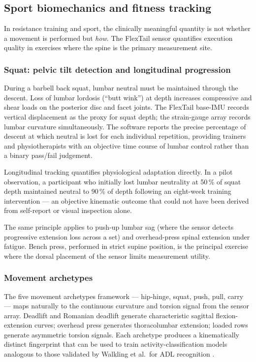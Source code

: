 \subsection{Sport biomechanics and fitness tracking}

In resistance training and sport, the clinically meaningful quantity is not whether
a movement is performed but \emph{how}.
The FlexTail sensor quantifies execution quality in exercises where the spine is the
primary measurement site.

\subsubsection{Squat: pelvic tilt detection and longitudinal progression}

During a barbell back squat, lumbar neutral must be maintained through the descent.
Loss of lumbar lordosis (``butt wink'') at depth increases compressive and shear loads
on the posterior disc and facet joints.
The FlexTail base-IMU records vertical displacement as the proxy for squat depth;
the strain-gauge array records lumbar curvature simultaneously.
The software reports the precise percentage of descent at which neutral is lost for
each individual repetition, providing trainers and physiotherapists with an objective
time course of lumbar control rather than a binary pass/fail judgement.

Longitudinal tracking quantifies physiological adaptation directly.
In a pilot observation, a participant who initially lost lumbar neutrality at 50\,\% of
squat depth maintained neutral to 90\,\% of depth following an eight-week training
intervention --- an objective kinematic outcome that could not have been derived from
self-report or visual inspection alone.

The same principle applies to push-up lumbar sag (where the sensor detects progressive
extension loss across a set) and overhead-press spinal extension under fatigue.
Bench press, performed in strict supine position, is the principal exercise where
the dorsal placement of the sensor limits measurement utility.

\subsubsection{Movement archetypes}

The five movement archetypes framework --- hip-hinge, squat, push, pull, carry ---
maps naturally to the continuous curvature and torsion signal from the sensor array.
Deadlift and Romanian deadlift generate characteristic sagittal flexion-extension
curves; overhead press generates thoracolumbar extension; loaded rows generate
asymmetric torsion signals.
Each archetype produces a kinematically distinct fingerprint that can be used to
train activity-classification models analogous to those validated by Walkling et al.\
for \acs{ADL} recognition \cite{walkling2025}.


